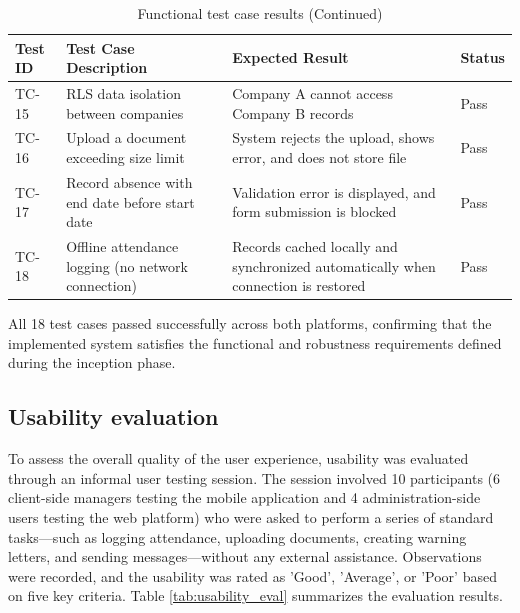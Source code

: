 \clearpage

\begin{table}[H]
\centering
\caption{Functional test case results (Continued)}
\label{tab:test_cases_cont}
\begin{tabular}{|l|p{6cm}|p{6cm}|l|}
\hline
\textbf{Test ID} & \textbf{Test Case Description} & \textbf{Expected Result} & \textbf{Status} \\
\hline
TC-15 & RLS data isolation between companies & Company A cannot access Company B records & Pass \\
\hline
TC-16 & Upload a document exceeding size limit & System rejects the upload, shows error, and does not store file & Pass \\
\hline
TC-17 & Record absence with end date before start date & Validation error is displayed, and form submission is blocked & Pass \\
\hline
TC-18 & Offline attendance logging (no network connection) & Records cached locally and synchronized automatically when connection is restored & Pass \\
\hline
\end{tabular}
\end{table}

All 18 test cases passed successfully across both platforms, confirming that the implemented system satisfies the functional and robustness requirements defined during the inception phase.

\subsection{Usability evaluation}
To assess the overall quality of the user experience, usability was evaluated through an informal user testing session. The session involved 10 participants (6 client-side managers testing the mobile application and 4 administration-side users testing the web platform) who were asked to perform a series of standard tasks—such as logging attendance, uploading documents, creating warning letters, and sending messages—without any external assistance. Observations were recorded, and the usability was rated as 'Good', 'Average', or 'Poor' based on five key criteria. Table \ref{tab:usability_eval} summarizes the evaluation results.

